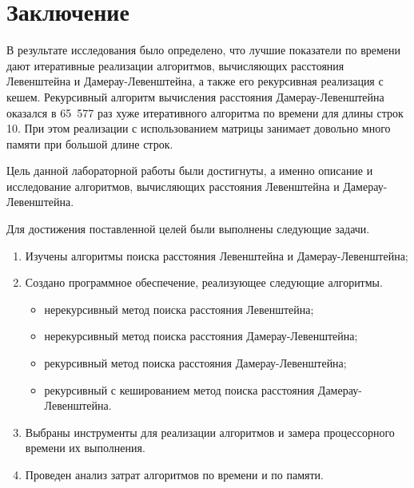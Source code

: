 \chapter*{Заключение}

В результате исследования было определено, что лучшие показатели по времени дают итеративные реализации алгоритмов, вычисляющих расстояния Левенштейна и Дамерау-Левенштейна, а также его рекурсивная реализация с кешем. Рекурсивный алгоритм вычисления расстояния Дамерау-Левенштейна оказался в 65 577 раз хуже итеративного алгоритма по времени для длины строк 10. При этом реализации с использованием матрицы занимает довольно много памяти при большой длине строк.

Цель данной лабораторной работы были достигнуты, а именно описание и исследование алгоритмов, вычисляющих расстояния Левенштейна и Дамерау-Левенштейна.

Для достижения поставленной целей были выполнены следующие задачи.
\begin{enumerate}[label={\arabic*)}]
	\item Изучены алгоритмы поиска расстояния Левенштейна и \newline Дамерау-Левенштейна;
	\item Создано программное обеспечение, реализующее следующие алгоритмы.
	\begin{itemize}[label=---]
		\item нерекурсивный метод поиска расстояния Левенштейна;
		\item нерекурсивный метод поиска расстояния Дамерау-Левенштейна;
		\item рекурсивный метод поиска расстояния Дамерау-Левенштейна;
		\item рекурсивный с кешированием метод поиска расстояния Дамерау-Левенштейна.
	\end{itemize}
	\item Выбраны инструменты для реализации алгоритмов и замера процессорного времени их выполнения.
	\item Проведен анализ затрат алгоритмов по времени и по памяти. 
\end{enumerate}